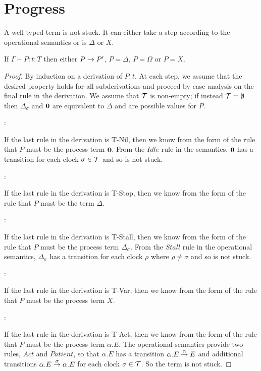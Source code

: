 \chapter{Progress}

A well-typed term is not stuck.  It can either take a step according
to the operational semantics or is $\Delta$ or $X$.

\begin{theorem}
If $\Gamma \vdash P : t : T$ then either $P \stackrel{}{\rightarrow} P'$, $P =
\Delta$, $P = \Omega$ or $P = X$.
\end{theorem}

\begin{proof}
By induction on a derivation of $P:t$.  At each step, we assume that
the desired property holds for all subderivations and proceed by case
analysis on the final rule in the derivation.  We assume that
$\text{$\mathcal{T}$}$ is non-empty; if instead $\text{$\mathcal{T}$} = \emptyset$ then
$\Delta_\sigma$ and $\textbf{0}$ are equivalent to $\Delta$ and are possible
values for $P$.

:

\noindent If the last rule in the derivation is T-Nil, then we know
from the form of the rule that $P$ must be the process term $\textbf{0}$.
From the $Idle$ rule in the semantics, $\textbf{0}$ has a transition for
each clock $\sigma \in \text{$\mathcal{T}$}$ and so is not stuck.

:

\noindent If the last rule in the derivation is T-Stop, then we know
from the form of the rule that $P$ must be the term $\Delta$.

:

\noindent If the last rule in the derivation is T-Stall, then we know
from the form of the rule that $P$ must be the process term
$\Delta_\sigma$.  From the $Stall$ rule in the operational semantics,
$\Delta_\sigma$ has a transition for each clock $\rho$ where $\rho \ne
\sigma$ and so is not stuck.

:

\noindent If the last rule in the derivation is T-Var, then we know
from the form of the rule that $P$ must be the process term $X$.

:

\noindent If the last rule in the derivation is T-Act, then we know
from the form of the rule that $P$ must be the process term
$\alpha.E$.  The operational semantics provide two rules, $Act$ and
$Patient$, so that $\alpha.E$ has a transition $\alpha.E
\stackrel{\alpha}{\rightarrow} E$ and additional transitions $\alpha.E
\stackrel{\sigma}{\rightarrow} \alpha.E$ for each clock $\sigma \in \text{$\mathcal{T}$}$.  So
the term is not stuck.


\end{proof}
